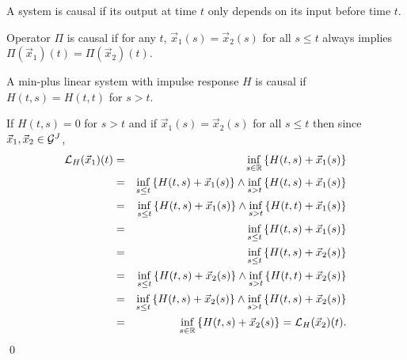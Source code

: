 
A system is causal if its output at time $t$ only depends on its input before time $t$.

\begin{definition}
Operator $\Pi$ is causal if for any $t$, $\vec{x}_1(s) = \vec{x}_2(s)$ for all $s \leq t$ always implies $\Pi(\vec{x}_1)(t) = \Pi(\vec{x}_2)(t) $.
\end{definition}



\begin{theorem}
A min-plus linear system with impulse response $H$ is causal if $H(t,s) = H(t,t)$ for $s > t$.
\end{theorem}

\pr If  $H(t,s) = 0$ for $s > t$  and if $\vec{x}_1(s) = \vec{x}_2(s)$ for all $s \leq t$ then since $\vec{x}_1,\vec{x}_2 \in \mathcal G^J$,
\begin{eqnarray*}
\mathcal L_{H}(\vec{x}_1)(t) & = & \inf_{s \in \mathbb{R}}  \left\{ H(t,s) + \vec{x}_1(s) \right\} \\
                & = & \inf_{s \leq t} \left\{ H(t,s) + \vec{x}_1(s) \right\} \wedge
                \inf_{s > t} \left\{ H(t,s) + \vec{x}_1(s) \right\} \\
            & = & \inf_{s \leq t} \left\{ H(t,s) + \vec{x}_1(s) \right\} \wedge
                \inf_{s > t} \left\{ H(t,t) + \vec{x}_1(s) \right\} \\
            & = & \inf_{s \leq t} \left\{ H(t,s) + \vec{x}_1(s) \right\} \\
            & = & \inf_{s \leq t} \left\{ H(t,s) + \vec{x}_2(s) \right\} \\
            & = & \inf_{s \leq t} \left\{ H(t,s) + \vec{x}_2(s) \right\} \wedge
                \inf_{s > t} \left\{ H(t,t) + \vec{x}_2(s) \right\} \\
            & = & \inf_{s \leq t} \left\{ H(t,s) + \vec{x}_2(s) \right\} \wedge
                \inf_{s > t} \left\{ H(t,s) + \vec{x}_2(s) \right\} \\
            & = & \inf_{s \in \mathbb{R}}  \left\{ H(t,s) + \vec{x}_2(s) \right\} = \mathcal L_{H}(\vec{x}_2)(t).
\end{eqnarray*}
\qed

